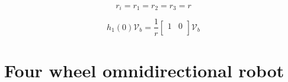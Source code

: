\documentclass{article}
\begin{document}
\begin{equation}
    r_i = r_1 = r_2 = r_3 = r
\end{equation}

\begin{equation}
    h_1(0) \mathcal{V}_b = \frac{1}{r}
    \left[
        \begin{array}{cc}
            1 & 0 \\
        \end{array}\right]
    \mathcal{V}_b
\end{equation}

\newpage
\section{Four wheel omnidirectional robot}
\end{document}
